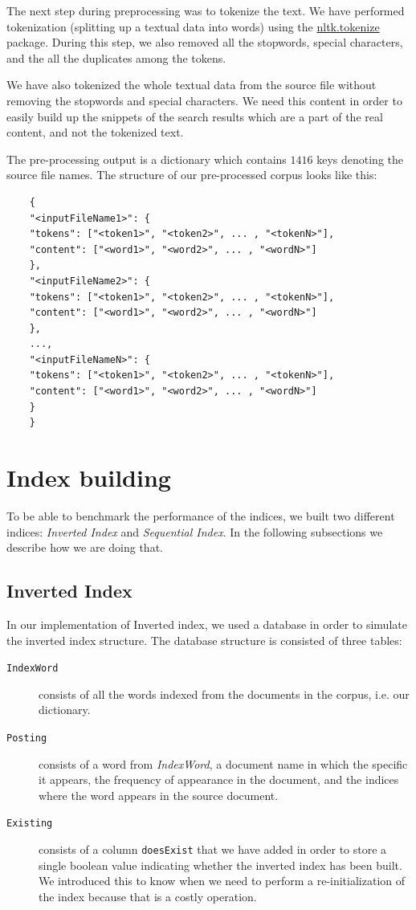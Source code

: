\documentclass{article}
\begin{document}
	The next step during preprocessing was to tokenize the text. We have performed tokenization (splitting up a textual data into words) using the \href{https://www.nltk.org/}{nltk.tokenize} package. During this step, we also removed all the stopwords, special characters, and the all the duplicates among the tokens.
	
	We have also tokenized the whole textual data from the source file without removing the stopwords and special characters. We need this content in order to easily build up the snippets of the search results which are a part of the real content, and not the tokenized text.
	
	The pre-processing output is a dictionary which contains $1416$ keys denoting the source file names. The structure of our pre-processed corpus looks like this:
	
	\begin{verbatim}
	{
	"<inputFileName1>": {
	"tokens": ["<token1>", "<token2>", ... , "<tokenN>"],
	"content": ["<word1>", "<word2>", ... , "<wordN>"]
	},
	"<inputFileName2>": {
	"tokens": ["<token1>", "<token2>", ... , "<tokenN>"],
	"content": ["<word1>", "<word2>", ... , "<wordN>"]
	},
	...,
	"<inputFileNameN>": {
	"tokens": ["<token1>", "<token2>", ... , "<tokenN>"],
	"content": ["<word1>", "<word2>", ... , "<wordN>"]
	}
	}
	\end{verbatim}
	
	\section{Index building}
	To be able to benchmark the performance of the indices, we built two different indices: \textit{Inverted Index} and \textit{Sequential Index}. In the following subsections we describe how we are doing that.
	
	\subsection{Inverted Index}
	In our implementation of Inverted index, we used a database in order to simulate the inverted index structure. The database structure is consisted of three tables:
	\begin{description}
		\item[\texttt{IndexWord}] consists of all the words indexed from the documents in the corpus, i.e. our dictionary.
		\item[\texttt{Posting}] consists of a word from \textit{IndexWord}, a document name in which the specific it appears, the frequency of appearance in the document, and the indices where the word appears in the source document.
		\item[\texttt{Existing}] consists of a column \texttt{doesExist} that we have added in order to store a single boolean value indicating whether the inverted index has been built. We introduced this to know when we need to perform a re-initialization of the index because that is a costly operation.
	\end{description}
	
\end{document}
